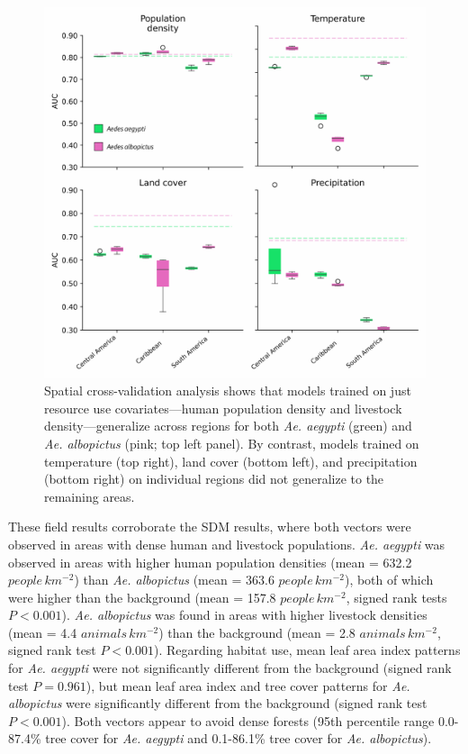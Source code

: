 \begin{figure}[!ht]
\includegraphics[width=\textwidth]{figures/ch3-cv-results.pdf}
\centering
\caption[Spatial cross-validation analysis showing models trained on just resource use covariates—human population density and livestock density—generalize across regions for both \textit{Ae. aegypti} and \textit{Ae. albopictus}.]{Spatial cross-validation analysis shows that models trained on just resource use covariates—human population density and livestock density—generalize across regions for both \textit{Ae. aegypti} (green) and \textit{Ae. albopictus} (pink; top left panel). By contrast, models trained on temperature (top right), land cover (bottom left), and precipitation (bottom right) on individual regions did not generalize to the remaining areas.}
\label{fig:cv-results}
\end{figure}

These field results corroborate the SDM results, where both vectors were observed in areas with dense human and livestock populations. \textit{Ae. aegypti} was observed in areas with higher human population densities (mean = 632.2 $people\, km^{-2}$) than \textit{Ae. albopictus} (mean = 363.6 $people\, km^{-2}$), both of which were higher than the background (mean = 157.8 $people\, km^{-2}$, signed rank tests $P < 0.001$). \textit{Ae. albopictus} was found in areas with higher livestock densities (mean = 4.4 $animals\, km^{-2}$) than the background (mean = 2.8 $animals\, km^{-2}$, signed rank test $P < 0.001$). Regarding habitat use, mean leaf area index patterns for \textit{Ae. aegypti} were not significantly different from the background (signed rank test $P = 0.961$), but mean leaf area index and tree cover patterns for \textit{Ae. albopictus} were significantly different from the background (signed rank test $P < 0.001$). Both vectors appear to avoid dense forests (95th percentile range 0.0-87.4\% tree cover for \textit{Ae. aegypti} and 0.1-86.1\% tree cover for \textit{Ae. albopictus}).

